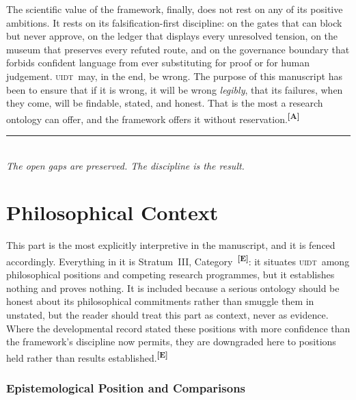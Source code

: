 \documentclass[12pt,a4paper,twoside]{article}
\theoremstyle{plain}
\theoremstyle{definition}
\theoremstyle{remark}
\newcommand{\UIDT}{\textsc{uidt}}
\newcommand{\catmark}[1]{\textsuperscript{\textsf{\textbf{[#1]}}}}
\begin{document}
The scientific value of the framework, finally, does not rest on any of its positive ambitions. It rests on its falsification-first discipline: on the gates that can block but never approve, on the ledger that displays every unresolved tension, on the museum that preserves every refuted route, and on the governance boundary that forbids confident language from ever substituting for proof or for human judgement. \UIDT\ may, in the end, be wrong. The purpose of this manuscript has been to ensure that if it is wrong, it will be wrong \emph{legibly}, that its failures, when they come, will be findable, stated, and honest. That is the most a research ontology can offer, and the framework offers it without reservation.\catmark{A}

\vspace{1.5em}
\begin{center}
\rule{0.4\textwidth}{0.4pt}\\[0.6em]
{\small\itshape The open gaps are preserved. The discipline is the result.}
\end{center}

\part{Philosophical Context}
\label{part:philosophical-context}

\noindent This part is the most explicitly interpretive in the manuscript, and it is fenced accordingly. Everything in it is Stratum~III, Category~\catmark{E}: it situates \UIDT\ among philosophical positions and competing research programmes, but it establishes nothing and proves nothing. It is included because a serious ontology should be honest about its philosophical commitments rather than smuggle them in unstated, but the reader should treat this part as context, never as evidence. Where the developmental record stated these positions with more confidence than the framework's discipline now permits, they are downgraded here to positions held rather than results established.\catmark{E}

\section{Epistemological Position and Comparisons}
\label{sec:epistemology}
\end{document}

